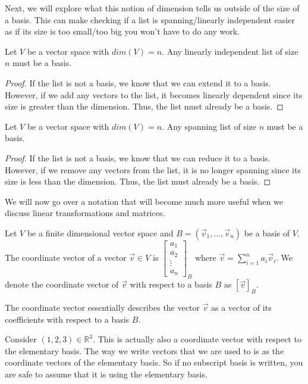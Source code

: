 Next, we will explore what this notion of dimension tells us outside of the size of a basis. This can make checking if a list is spanning/linearly independent easier as if its size is too small/too big you won't have to do any work.
\begin{corollary}
    Let $V$ be a vector space with $dim(V)=n$. Any linearly independent list of size $n$ must be a basis.
\end{corollary}
\begin{proof}
    If the list is not a basis, we know that we can extend it to a basis. However, if we add any vectors to the list, it becomes linearly dependent since its size is greater than the dimension. Thus, the list must already be a basis.
\end{proof}
\begin{corollary}
    Let $V$ be a vector space with $dim(V)=n$. Any spanning list of size $n$ must be a basis.
\end{corollary}
\begin{proof}
    If the list is not a basis, we know that we can reduce it to a basis. However, if we remove any vectors from the list, it is no longer spanning since its size is less than the dimension. Thus, the list must already be a basis.
\end{proof}
We will now go over a notation that will become much more useful when we discuss linear transformations and matrices. 
\begin{definition}
    Let $V$ be a finite dimensional vector space and $B=(\vec{v}_1,\ldots,\vec{v}_n)$ be a basis of $V$. The coordinate vector of a vector $\vec{v}\in V$ is $\left[\begin{smallmatrix}
        a_1 \\ a_2 \\ \vdots \\ a_n
    \end{smallmatrix}\right]_B$ where $\vec{v}=\sum_{i=1}^n a_i\vec{v}_i$. We denote the coordinate vector of $\vec{v}$ with respect to a basis $B$ as $[\vec{v}]_B$.
\end{definition}
\begin{remark}
    The coordinate vector essentially describes the vector $\vec{v}$ as a vector of its coefficients with respect to a basis $B$.
\end{remark}
\begin{remark}
    Consider $(1,2,3)\in\mathbb{R}^3$. This is actually also a coordinate vector with respect to the elementary basis. The way we write vectors that we are used to is as the coordinate vectors of the elementary basis. So if no subscript basis is written, you are safe to assume that it is using the elementary basis.
\end{remark}
